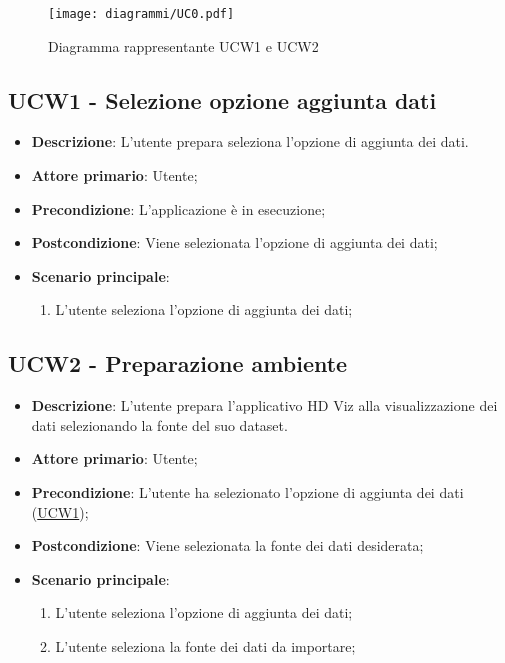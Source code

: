 \begin{figure}[h]
    \centering
    \texttt{[image: diagrammi/UC0.pdf]}
    \caption{Diagramma rappresentante UCW1 e UCW2}
    \label{fig:UCW0}
\end{figure}

\subsection{UCW1 - Selezione opzione aggiunta dati}
\label{sub:ucw1}

\begin{itemize}
    \item \textbf{Descrizione}: L'utente prepara seleziona l'opzione di aggiunta dei dati.
	
    \item \textbf{Attore primario}: Utente;
        
    \item \textbf{Precondizione}:   L'applicazione è in esecuzione;

	\item \textbf{Postcondizione}:  Viene selezionata l'opzione di aggiunta dei dati;

	\item \textbf{Scenario principale}:
		\begin{enumerate}
			\item L'utente seleziona l'opzione di aggiunta dei dati;
        \end{enumerate}
   
\end{itemize}

\subsection{UCW2 - Preparazione ambiente}
\label{sub:ucw2}

\begin{itemize}
    \item \textbf{Descrizione}: L'utente prepara l'applicativo HD Viz alla visualizzazione dei dati selezionando la fonte del suo dataset.
	
    \item \textbf{Attore primario}: Utente;
        
    \item \textbf{Precondizione}:   L'utente ha selezionato l'opzione di aggiunta dei dati (\hyperref[sub:ucw1]{UCW1});

    \item \textbf{Postcondizione}:  Viene selezionata la fonte dei dati desiderata;

	\item \textbf{Scenario principale}:
		\begin{enumerate}
			\item L'utente seleziona l'opzione di aggiunta dei dati;
            \item L'utente seleziona la fonte dei dati da importare;
        \end{enumerate}
   
\end{itemize}

